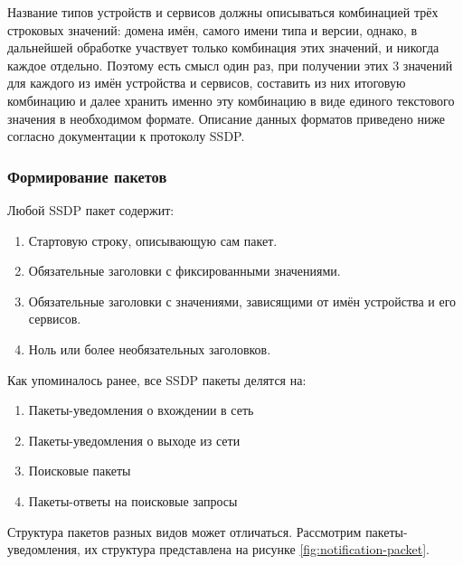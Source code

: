 Название типов устройств и сервисов должны описываться комбинацией трёх строковых значений: домена имён, самого имени типа и версии, однако, в дальнейшей обработке участвует только комбинация этих значений, и никогда каждое отдельно.
Поэтому есть смысл один раз, при получении этих 3 значений для каждого из имён устройства и сервисов, составить из них итоговую комбинацию и далее хранить именно эту комбинацию в виде единого текстового значения в необходимом формате.
Описание данных форматов приведено ниже согласно документации к протоколу SSDP.

\subsubsection{Формирование пакетов}

Любой SSDP пакет содержит:
\begin{enumerate}
	\item Стартовую строку, описывающую сам пакет.
	\item Обязательные заголовки с фиксированными значениями.
	\item Обязательные заголовки с значениями, зависящими от имён устройства и его сервисов.
	\item Ноль или более необязательных заголовков.
\end{enumerate}

Как упоминалось ранее, все SSDP пакеты делятся на:
\begin{enumerate}
	\item Пакеты-уведомления о вхождении в сеть
	\item Пакеты-уведомления о выходе из сети
	\item Поисковые пакеты
	\item Пакеты-ответы на поисковые запросы
\end{enumerate}

Структура пакетов разных видов может отличаться.
Рассмотрим пакеты-уведомления, их структура представлена на рисунке \ref{fig:notification-packet}.


